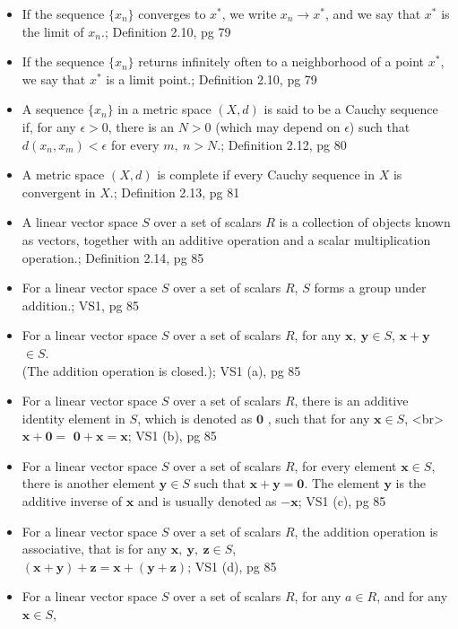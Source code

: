 \documentclass{article}
\begin{document}
\begin{multicols}{2}
\begin{itemize}
\item If the sequence $\{x_n\}$ converges to $x^*$, we write $x_n \rightarrow x^* $, and we say that $x^*$ is the limit of $x_n$.; Definition 2.10, pg 79
\item If the sequence $\{x_n\}$ returns infinitely often to a neighborhood of a point $x^*$, we say that $x^*$ is a limit point.; Definition 2.10, pg 79
\item A sequence $\{x_n\}$ in a metric space $ (X, d) $ is said to be a Cauchy sequence if, for any $\epsilon > 0$, there is an $ N > 0$ (which may depend on $\epsilon$) such that $d(x_n, x_m) < \epsilon $  for every $m,\:n > N$.; Definition 2.12, pg 80
\item A metric space $(X, d)$ is complete if every Cauchy sequence in $X$ is convergent in $X$.; Definition 2.13, pg 81
\item A linear vector space $S$ over a set of scalars $R$ is a collection of objects known as vectors, together with an additive operation and a scalar multiplication operation.; Definition 2.14, pg 85
\item For a linear vector space $S$ over a set of scalars $R$, $S$ forms a group under addition.; VS1, pg 85 
\item For a linear vector space $S$ over a set of scalars $R$, for any $\mathbf{x}, \: \mathbf{y} \in S $, $\mathbf{x} + \mathbf{y}$ $\in S$. \\
(The addition operation is closed.); VS1 (a), pg 85
\item For a linear vector space $S$ over a set of scalars $R$, there is an additive identity element in $S$, which is denoted as $ \mathbf{0} $ , such that for any $\mathbf{x} \in S$, <br>$\mathbf{x} + \mathbf{0} = $  $\mathbf{0} + \mathbf{x} = \mathbf{x} $; VS1 (b), pg 85
\item For a linear vector space $S$ over a set of scalars $R$, for every element $\mathbf{x} \in S$, there is another element $\mathbf{y} \in S$ such that $\mathbf{x} + \mathbf{y} = \mathbf{0} $. The element $\mathbf{y}$ is the additive inverse of $\mathbf{x}$ and is usually denoted as $-\mathbf{x}$; VS1 (c), pg 85
\item For a linear vector space $S$ over a set of scalars $R$, the addition operation is associative, that is for any $\mathbf{x}, \: \mathbf{y}, \: \mathbf{z} \in S $, \\
 $ (\mathbf{x} + \mathbf{y}) + \mathbf{z} = \mathbf{x} + (\mathbf{y} + \mathbf{z}) $; VS1 (d), pg 85
\item For a linear vector space $S$ over a set of scalars $R$, for any $a \in R$, and for any $\mathbf{x} \in S $, \\

\end{itemize}
\end{multicols}
\end{document}
